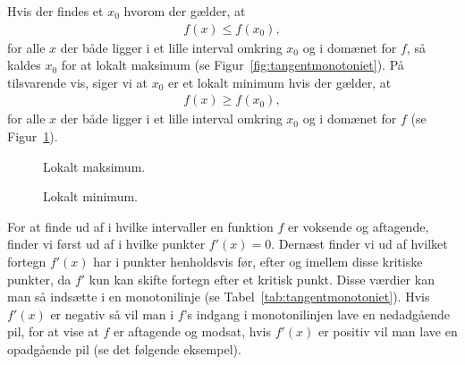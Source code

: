 Hvis der findes et $x_0$ hvorom der gælder, at 
\begin{align*}
f(x) \leq f(x_0),
\end{align*}
for alle $x$ der både ligger i et lille interval omkring $x_0$ og i domænet for $f$, så kaldes $x_0$ for at lokalt maksimum (se Figur~\ref{fig:tangentmonotoniet}). På tilsvarende vis, siger vi at $x_0$ er et lokalt minimum hvis der gælder, at
\begin{align*}
f(x) \geq f(x_0),
\end{align*}
for alle $x$ der både ligger i et lille interval omkring $x_0$ og i domænet for $f$ (se Figur~\ref{fig:tangentmonotonito}).
\begin{figure}[!htbp]
\begin{minipage}{0.49\textwidth}
\centering
{}
\caption{Lokalt maksimum.}
\label{fig:tangentmonotoniet}
\end{minipage}
\begin{minipage}{0.49\textwidth}
 \centering
{}
\caption{Lokalt minimum.}
\label{fig:tangentmonotonito}
\end{minipage}
\end{figure}

For at finde ud af i hvilke intervaller en funktion $f$ er voksende og aftagende, finder vi først ud af i hvilke punkter $f'(x)=0$. Dernæst finder vi ud af hvilket fortegn $f'(x)$ har i punkter henholdsvis før, efter og imellem disse kritiske punkter, da $f'$ kun kan skifte fortegn efter et kritisk punkt. Disse værdier kan man så indsætte i en monotonilinje (se Tabel~\ref{tab:tangentmonotoniet}). Hvis $f'(x)$ er negativ så vil man i $f$'s indgang i monotonilinjen lave en nedadgående pil, for at vise at $f$ er aftagende og modsat, hvis $f'(x)$ er positiv vil man lave en opadgående pil (se det følgende eksempel).

